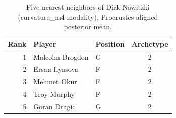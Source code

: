 \begin{table}[htbp]
  \centering\small
  \begin{tabular}{rllc}
    \toprule
    Rank & Player & Position & Archetype \\
    \midrule
    1 & Malcolm Brogdon & G & 2 \\
    2 & Ersan Ilyasova & F & 2 \\
    3 & Mehmet Okur & F & 2 \\
    4 & Troy Murphy & F & 2 \\
    5 & Goran Dragic & G & 2 \\
    \bottomrule
  \end{tabular}
  \caption{Five nearest neighbors of Dirk Nowitzki (curvature_m4 modality), Procrustes-aligned posterior mean.}
  \label{tab:Dirk_Nowitzki_neighbors_curvature_m4}
\end{table}

